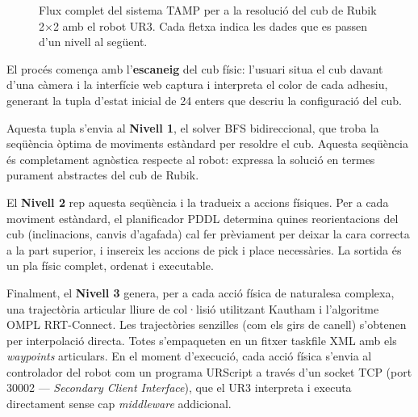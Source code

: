 \documentclass[12pt, a4paper]{article}
\begin{document}
\begin{figure}[H]
\caption{Flux complet del sistema TAMP per a la resolució del cub de Rubik 2$\times$2 amb el robot UR3. Cada fletxa indica les dades que es passen d'un nivell al següent.}
\label{fig:tamp_flow}
\end{figure}

El procés comença amb l'\textbf{escaneig} del cub físic: l'usuari situa el cub davant d'una càmera i la interfície web captura i interpreta el color de cada adhesiu, generant la tupla d'estat inicial de 24 enters que descriu la configuració del cub.

Aquesta tupla s'envia al \textbf{Nivell 1}, el solver BFS bidireccional, que troba la seqüència òptima de moviments estàndard per resoldre el cub. Aquesta seqüència és completament agnòstica respecte al robot: expressa la solució en termes purament abstractes del cub de Rubik.

El \textbf{Nivell 2} rep aquesta seqüència i la tradueix a accions físiques. Per a cada moviment estàndard, el planificador PDDL determina quines reorientacions del cub (inclinacions, canvis d'agafada) cal fer prèviament per deixar la cara correcta a la part superior, i insereix les accions de pick i place necessàries. La sortida és un pla físic complet, ordenat i executable.

Finalment, el \textbf{Nivell 3} genera, per a cada acció física de naturalesa complexa, una trajectòria articular lliure de col·lisió utilitzant Kautham i l'algoritme OMPL RRT-Connect. Les trajectòries senzilles (com els girs de canell) s'obtenen per interpolació directa. Totes s'empaqueten en un fitxer taskfile XML amb els \textit{waypoints} articulars. En el moment d'execució, cada acció física s'envia al controlador del robot com un programa URScript a través d'un socket TCP (port 30002 — \textit{Secondary Client Interface}), que el UR3 interpreta i executa directament sense cap \textit{middleware} addicional.
\newpage
\newpage
\end{document}
